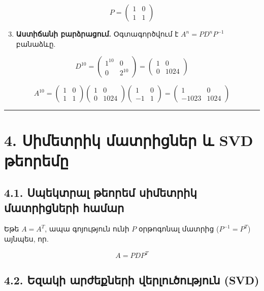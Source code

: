 \documentclass[12pt, a4paper]{article}
\begin{document}
$$
P =
\begin{pmatrix}
1 & 0 \\
1 & 1
\end{pmatrix}
$$

\begin{enumerate}
    \setcounter{enumi}{2}
    \item \textbf{Աստիճանի բարձրացում.} Օգտագործվում է $A^n = P D^n P^{-1}$ բանաձևը.
\end{enumerate}

$$
D^{10} =
\begin{pmatrix}
1^{10} & 0 \\
0 & 2^{10}
\end{pmatrix}
=
\begin{pmatrix}
1 & 0 \\
0 & 1024
\end{pmatrix}
$$

$$
A^{10} =
\begin{pmatrix}
1 & 0 \\
1 & 1
\end{pmatrix}
\begin{pmatrix}
1 & 0 \\
0 & 1024
\end{pmatrix}
\begin{pmatrix}
1 & 0 \\
-1 & 1
\end{pmatrix}
=
\begin{pmatrix}
1 & 0 \\
-1023 & 1024
\end{pmatrix}
$$

\vspace{1em}
\hrule
\vspace{1em}

\section{4. Սիմետրիկ մատրիցներ և SVD թեորեմը}

\subsection{4.1. Սպեկտրալ թեորեմ սիմետրիկ մատրիցների համար}

Եթե $A = A^T$, ապա գոյություն ունի $P$ օրթոգոնալ մատրից ($P^{-1} = P^T$) այնպես, որ.

$$
A = P D P^T
$$

\subsection{4.2. Եզակի արժեքների վերլուծություն (SVD)}
\end{document}
